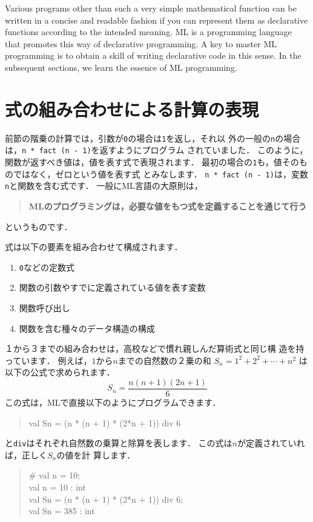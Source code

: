 \documentclass{jbook}
\newif\ifjp
\newcommand{\txt}[2]{#1}
\newenvironment{program}{\begin{quote}\begin{tt}}%
                        {\end{tt}\end{quote}}
\begin{document}
	
	Various programs other than such a very simple mathematical
function can be written in a concise and readable fashion if you
can represent them as declarative functions according to the intended
meaning.
	ML is a programming language that promotes this way of declarative
programming.
	A key to master ML programming is to obtain a skill of writing
declarative code in this sense.
	In the subsequent sections, we learn the essence of ML
programming.
\fi%

\section{
\txt{式の組み合わせによる計算の表現}
{Representing computation by composing expressions}
}
\label{sec:tutorialExpression}

\ifjp%
	前節の階乗の計算では，引数が{\tt 0}の場合は{\tt 1}を返し，それ以
外の一般の{\tt n}の場合は，{\tt n * fact (n - 1)}を返すようにプログラム
されていました．
	このように，関数が返すべき値は，値を表す式で表現されます．
	最初の場合の{\tt 1}も，値そのものではなく，ゼロという値を表す式
とみなします．
	{\tt n * fact (n - 1)}は，変数{\tt n}と関数を含む式です．
	一般にML言語の大原則は，
\begin{quote}
{\bf MLのプログラミングは，必要な値をもつ式を定義することを通じて行う}
\end{quote}
というものです．

	式は以下の要素を組み合わせて構成されます．
\begin{enumerate}
\item {\tt 0}などの定数式
\item 関数の引数やすでに定義されている値を表す変数
\item 関数呼び出し
\item 関数を含む種々のデータ構造の構成
\end{enumerate}
	１から３までの組み合わせは，高校などで慣れ親しんだ算術式と同じ構
造を持っています．
	例えば，$1$から$n$までの自然数の２乗の和
$S_n = 1^2 + 2^2 + \cdots + n^2$
は以下の公式で求められます．
\[
S_n = \frac{n (n + 1) (2n + 1)}{6}
\]
この式は，MLで直接以下のようにプログラムできます．
\begin{program}
val Sn = (n * (n + 1) * (2*n + 1)) div 6
\end{program}
	{\tt *}と{\tt div}はそれぞれ自然数の乗算と除算を表します．
	この式は$n$が定義されていれば，正しく$S_n$の値を計
算します．
\begin{program}
\# val n = 10;\\
val n = 10 : int\\
val Sn = (n * (n + 1) * (2*n + 1)) div 6;\\
val Sn = 385 : int
\end{program}
\end{document}
